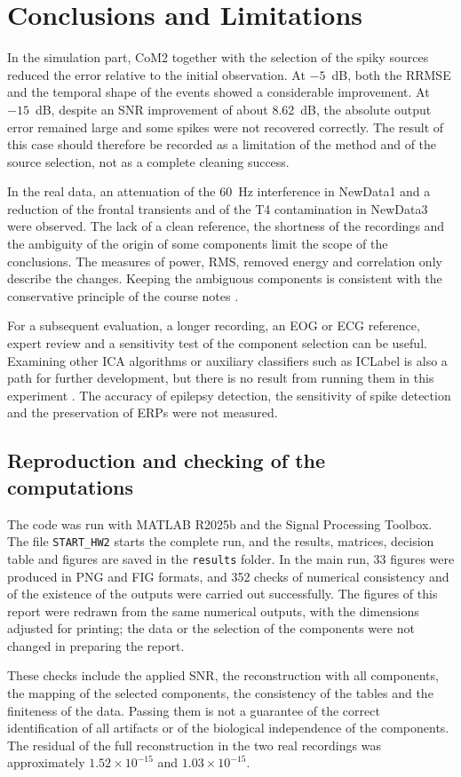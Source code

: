 \section{Conclusions and Limitations}

In the simulation part, CoM2 together with the selection of the spiky sources reduced the error relative to the initial observation. At $-5$~dB, both the RRMSE and the temporal shape of the events showed a considerable improvement. At $-15$~dB, despite an SNR improvement of about 8.62~dB, the absolute output error remained large and some spikes were not recovered correctly. The result of this case should therefore be recorded as a limitation of the method and of the source selection, not as a complete cleaning success.

In the real data, an attenuation of the 60~Hz interference in NewData1 and a reduction of the frontal transients and of the T4 contamination in NewData3 were observed. The lack of a clean reference, the shortness of the recordings and the ambiguity of the origin of some components limit the scope of the conclusions. The measures of power, RMS, removed energy and correlation only describe the changes. Keeping the ambiguous components is consistent with the conservative principle of the course notes .

For a subsequent evaluation, a longer recording, an EOG or ECG reference, expert review and a sensitivity test of the component selection can be useful. Examining other ICA algorithms or auxiliary classifiers such as ICLabel is also a path for further development, but there is no result from running them in this experiment . The accuracy of epilepsy detection, the sensitivity of spike detection and the preservation of ERPs were not measured.

\subsection*{Reproduction and checking of the computations}

The code was run with MATLAB R2025b and the Signal Processing Toolbox. The file \texttt{START\_HW2} starts the complete run, and the results, matrices, decision table and figures are saved in the \texttt{results} folder. In the main run, 33 figures were produced in PNG and FIG formats, and 352 checks of numerical consistency and of the existence of the outputs were carried out successfully. The figures of this report were redrawn from the same numerical outputs, with the dimensions adjusted for printing; the data or the selection of the components were not changed in preparing the report.

These checks include the applied SNR, the reconstruction with all components, the mapping of the selected components, the consistency of the tables and the finiteness of the data. Passing them is not a guarantee of the correct identification of all artifacts or of the biological independence of the components. The residual of the full reconstruction in the two real recordings was approximately $1.52\times10^{-15}$ and $1.03\times10^{-15}$.
